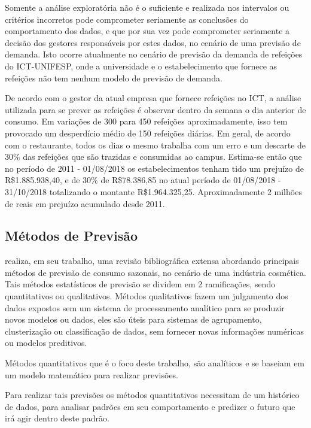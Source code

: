 \documentclass[	12pt, Times, openright, twoside, a4paper, english, brazil]{abntex2}
\begin{document}
          Somente a análise exploratória não é o suficiente e realizada nos intervalos ou critérios incorretos pode comprometer seriamente as conclusões do comportamento dos dados, e que por sua vez pode comprometer seriamente a decisão dos gestores responsáveis por estes dados, no cenário de uma previsão de demanda. 
          Isto ocorre atualmente no cenário de previsão da demanda de refeições do ICT-UNIFESP, onde a universidade e o estabelecimento que fornece as refeições não tem nenhum modelo de previsão de demanda. 

          De acordo com o gestor da atual empresa que fornece refeições no ICT, a análise utilizada para se prever as refeições é observar dentro da semana o dia anterior de consumo. Em variações de 300 para 450 refeições aproximadamente, isso tem provocado um desperdício médio de 150 refeições diárias. Em geral, de acordo com o restaurante, todos os dias o mesmo trabalha com um erro e um descarte de 30\% das refeições que são trazidas e consumidas ao campus. Estima-se então que no período de 2011 - 01/08/2018 os estabelecimentos tenham tido um prejuízo de R\$1.885.938,40, e de 30\% de R\$78.386,85 no atual período de 01/08/2018 - 31/10/2018 totalizando o montante  R\$1.964.325,25. Aproximadamente 2 milhões de reais em prejuízo acumulado desde 2011.

        \subsection{Métodos de Previsão} 

          \cite{Junior2007} realiza, em seu trabalho, uma revisão bibliográfica extensa abordando principais métodos de previsão de consumo sazonais, no cenário de uma indústria cosmética. Tais métodos estatísticos de previsão se dividem em 2 ramificações, sendo quantitativos ou qualitativos. Métodos qualitativos fazem um julgamento dos dados expostos sem um sistema de processamento analítico para se produzir novos modelos ou dados, eles são úteis para sistemas de agrupamento, clusterização ou classificação de dados, sem fornecer novas informações numéricas ou modelos preditivos.

          Métodos quantitativos que é o foco deste trabalho, são analíticos e se baseiam em um modelo matemático para realizar previsões. 

          Para realizar tais previsões os métodos quantitativos necessitam de um histórico de dados, para analisar padrões em seu comportamento e predizer o futuro que irá agir dentro deste padrão.
\end{document}
